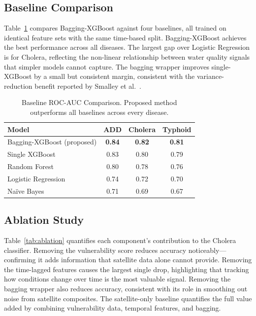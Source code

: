 \documentclass[conference]{IEEEtran}
\begin{document}
\subsection{Baseline Comparison}

Table~\ref{tab:comparison} compares Bagging-XGBoost against four
baselines, all trained on identical feature sets with the same time-based
split. Bagging-XGBoost achieves the best performance across all diseases.
The largest gap over Logistic Regression is for Cholera, reflecting the
non-linear relationship between water quality signals that simpler models
cannot capture. The bagging wrapper improves single-XGBoost by a small
but consistent margin, consistent with the variance-reduction benefit
reported by Smalley et al.\ \cite{smalley2025}.

\begin{table}[!t]
\caption{Baseline ROC-AUC Comparison. Proposed method outperforms all baselines across every disease.}
\label{tab:comparison}
\centering
\renewcommand{\arraystretch}{1.15}
\begin{tabular}{|l|c|c|c|}
\hline
\textbf{Model} & \textbf{ADD} & \textbf{Cholera} & \textbf{Typhoid} \\
\hline
Bagging-XGBoost (proposed) & \textbf{0.84} & \textbf{0.82} & \textbf{0.81} \\
Single XGBoost             & 0.83 & 0.80 & 0.79 \\
Random Forest              & 0.80 & 0.78 & 0.76 \\
Logistic Regression        & 0.74 & 0.72 & 0.70 \\
Na\"ive Bayes              & 0.71 & 0.69 & 0.67 \\
\hline
\end{tabular}
\end{table}

\subsection{Ablation Study}

Table~\ref{tab:ablation} quantifies each component's contribution to
the Cholera classifier. Removing the vulnerability score reduces accuracy
noticeably---confirming it adds information that satellite data alone
cannot provide. Removing the time-lagged features causes the largest
single drop, highlighting that tracking how conditions change over time
is the most valuable signal. Removing the bagging wrapper also reduces
accuracy, consistent with its role in smoothing out noise from satellite
composites. The satellite-only baseline quantifies the full value added
by combining vulnerability data, temporal features, and bagging.
\end{document}
